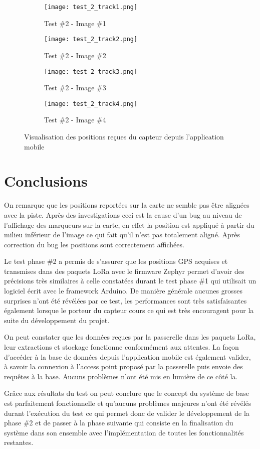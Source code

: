 \begin{figure}[htb]
\centering
\begin{subfigure}{.5\textwidth}
  \centering
  \texttt{[image: test\_2\_track1.png]}
  \caption{Test \#2 - Image \#1}
  \label{fig:test_2_track1}
\end{subfigure}%
\begin{subfigure}{.5\textwidth}
  \centering
  \texttt{[image: test\_2\_track2.png]}
  \caption{Test \#2 - Image \#2}
  \label{fig:test_2_track2}
\end{subfigure}
\begin{subfigure}{.5\textwidth}
  \centering
  \texttt{[image: test\_2\_track3.png]}
  \caption{Test \#2 - Image \#3}
  \label{fig:test_2_track3}
\end{subfigure}%
\begin{subfigure}{.5\textwidth}
  \centering
  \texttt{[image: test\_2\_track4.png]}
  \caption{Test \#2 - Image \#4}
  \label{fig:test_2_track4}
\end{subfigure}
\caption{Visualisation des positions reçues du capteur depuis l'application mobile}
\label{fig:test_2}
\end{figure}

\section{Conclusions}

On remarque que les positions reportées sur la carte ne semble pas être alignées avec la piste. Après des investigations ceci est la cause d'un bug au niveau de l'affichage des marqueurs sur la carte, en effet la position est appliqué à partir du milieu inférieur de l'image ce qui fait qu'il n'est pas totalement aligné. Après correction du bug les positions sont correctement affichées.

Le test phase \#2 a permis de s'assurer que les positions GPS acquises et transmises dans des paquets LoRa avec le firmware Zephyr permet d'avoir des précisions très similaires à celle constatées durant le test phase \#1 qui utilisait un logiciel écrit avec le framework Arduino. De manière générale aucunes grosses surprises n'ont été révélées par ce test, les performances sont très satisfaisantes également lorsque le porteur du capteur cours ce qui est très encouragent pour la suite du développement du projet.

On peut constater que les données reçues par la passerelle dans les paquets LoRa, leur extractions et stockage fonctionne conformément aux attentes. La façon d'accéder à la base de données depuis l'application mobile est également valider, à savoir la connexion à l'access point proposé par la passerelle puis envoie des requêtes à la base. Aucuns problèmes n'ont été mis en lumière de ce côté la.

Grâce aux résultats du test on peut conclure que le concept du système de base est parfaitement fonctionnelle et qu'aucuns problèmes majeures n'ont été révélés durant l'exécution du test ce qui permet donc de valider le développement de la phase \#2 et de passer à la phase suivante qui consiste en la finalisation du système dans son ensemble avec l'implémentation de toutes les fonctionnalités restantes.
